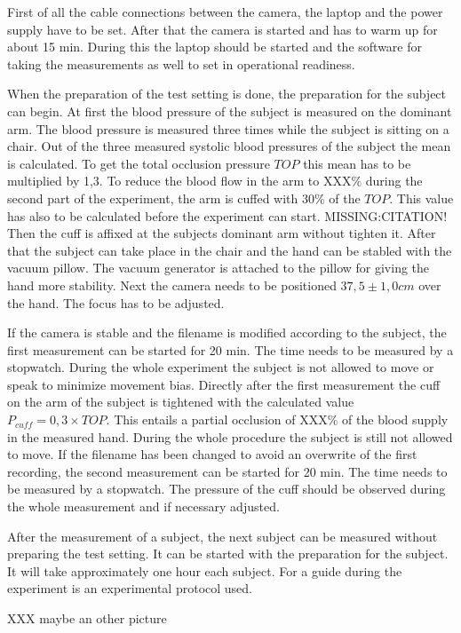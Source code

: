 First of all the cable connections between the camera, the laptop and the power supply have to be set. After that the camera is started and has to warm up for about 15 min. During this the laptop should be started and the software for taking the measurements as well to set in operational readiness.

When the preparation of the test setting is done, the preparation for the subject can begin. At first the blood pressure of the subject is measured on the dominant arm. The blood pressure is measured three times while the subject is sitting on a chair. Out of the three measured systolic blood pressures of the subject the mean is calculated. To get the total occlusion pressure $TOP$ this mean has to be multiplied by 1,3. To reduce the blood flow in the arm to XXX\% during the second part of the experiment, the arm is cuffed with 30\% of the $TOP$. This value has also to be calculated before the experiment can start. MISSING:CITATION!
Then the cuff is affixed at the subjects dominant arm without tighten it. After that the subject can take place in the chair and the hand can be stabled with the vacuum pillow. The vacuum generator is attached to the pillow for giving the hand more stability. Next the camera needs to be positioned $37,5\pm 1,0 cm$ over the hand. The focus has to be adjusted. 

If the camera is stable and the filename is modified according to the subject, the first measurement can be started for 20 min. The time needs to be measured by a stopwatch. During the whole experiment the subject is not allowed to move or speak to minimize movement bias.
Directly after the first measurement the cuff on the arm of the subject is tightened with the calculated value $P_{cuff}=0,3\times TOP$. This entails a partial occlusion of XXX\% of the blood supply in the measured hand. During the whole procedure the subject is still not allowed to move. If the filename has been changed to avoid an overwrite of the first recording, the second measurement can be started for 20 min. The time needs to be measured by a stopwatch. The pressure of the cuff should be observed during the whole measurement and if necessary adjusted.

After the measurement of a subject, the next subject can be measured without preparing the test setting. It can be started with the preparation for the subject. It will take approximately one hour each subject. For a guide during the experiment is an experimental protocol used.

XXX maybe an other picture
